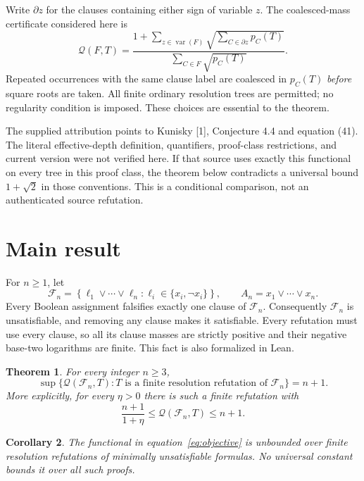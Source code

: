 \documentclass[11pt]{article}
\newtheorem{theorem}{Theorem}\newtheorem{lemma}[theorem]{Lemma}\newtheorem{corollary}[theorem]{Corollary}
\newcommand{\Q}{\mathcal Q}\newcommand{\F}{\mathcal F}
\begin{document}
Write $\partial z$ for the clauses containing either sign of variable $z$. The coalesced-mass certificate considered here is
\begin{equation}\label{eq:objective}
 \Q(F,T)=\frac{1+\displaystyle\sum_{z\in\operatorname{var}(F)}
       \sqrt{\displaystyle\sum_{C\in\partial z}p_C(T)}}
       {\displaystyle\sum_{C\in F}\sqrt{p_C(T)}}.
\end{equation}
Repeated occurrences with the same clause label are coalesced in $p_C(T)$
\emph{before} square roots are taken. All finite ordinary resolution trees
are permitted; no regularity condition is imposed. These choices are
essential to the theorem.

The supplied attribution points to Kunisky [1], Conjecture 4.4 and equation
(41). The literal effective-depth definition, quantifiers, proof-class
restrictions, and current version were not verified here. If that source
uses exactly this functional on every tree in this proof class, the theorem
below contradicts a universal bound $1+\sqrt2$ in those conventions.
This is a conditional comparison, not an authenticated source refutation.

\section{Main result}
For $n\ge1$, let
\[
 \F_n=\left\{\ell_1\vee\cdots\vee\ell_n:
       \ell_i\in\{x_i,\neg x_i\}\right\},\qquad
 A_n=x_1\vee\cdots\vee x_n.
\]
Every Boolean assignment falsifies exactly one clause of $\F_n$. Consequently $\F_n$ is unsatisfiable, and removing any clause makes it satisfiable. Every refutation must use every clause, so all its clause masses are strictly positive and their negative base-two logarithms are finite. This fact is also formalized in Lean.

\begin{theorem}\label{thm:main}
For every integer $n\ge3$,
\[
 \sup\{\Q(\F_n,T):T\text{ is a finite resolution refutation of }\F_n\}=n+1.
\]
More explicitly, for every $\eta>0$ there is such a finite refutation with
\[
 \frac{n+1}{1+\eta}\le\Q(\F_n,T)\le n+1.
\]
\end{theorem}

\begin{corollary}
The functional in equation~\eqref{eq:objective} is unbounded over finite resolution refutations of minimally unsatisfiable formulas. No universal constant bounds it over all such proofs.
\end{corollary}
\end{document}
